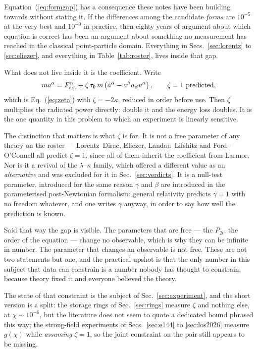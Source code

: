 \documentclass[preprint]{aastex701}
\newcommand{\Fext}{F^\alpha_{\rm ext}}
\newcommand{\taunought}{\tau_0}
\begin{document}
Equation~(\ref{eq:formgap}) has a consequence these notes have been building
towards without stating it. If the differences among the candidate \emph{forms}
are $10^{-5}$ at the very best and $10^{-9}$ in practice, then eighty years of
argument about which equation is correct has been an argument about something no
measurement has reached in the classical point-particle domain. Everything in
Secs.~\ref{sec:lorentz} to
\ref{sec:eliezer}, and everything in Table~\ref{tab:roster}, lives inside that
gap.

What does not live inside it is the coefficient. Write
\begin{equation}
ma^\alpha = \Fext + \zeta\,\taunought\,m
\left(\dot a^\alpha - a^\beta a_\beta u^\alpha\right),
\qquad \zeta = 1 \ \text{predicted},
\label{eq:zetadef}
\end{equation}
which is Eq.~(\ref{eq:zeta}) with $\zeta=-2\kappa$, reduced in order before use.
Then $\zeta$ multiplies the radiated power directly: double it and the energy
loss doubles. It is the one quantity in this problem to which an experiment is
linearly sensitive.

The distinction that matters is what $\zeta$ is for. It is not a free parameter
of any theory on the roster --- Lorentz--Dirac, Eliezer, Landau--Lifshitz and
Ford--O'Connell all predict $\zeta=1$, since all of them inherit the coefficient
from Larmor. Nor is it a revival of the $\lambda$--$\kappa$ family, which
offered a different value as an \emph{alternative} and was excluded for it in
Sec.~\ref{sec:verdicts}. It is a null-test parameter, introduced for the same
reason $\gamma$ and $\beta$ are introduced in the parameterised post-Newtonian
formalism: general relativity predicts $\gamma=1$ with no freedom whatever, and
one writes $\gamma$ anyway, in order to say how well the prediction is known.

Said that way the gap is visible. The parameters that are free --- the $P_{2i}$,
the order of the equation --- change no observable, which is why they can be
infinite in number. The parameter that changes an observable is not free. These
are not two statements but one, and the practical upshot is that the only
number in this subject that data can constrain is a number nobody has thought to
constrain, because theory fixed it and everyone believed the theory.

The state of that constraint is the subject of Sec.~\ref{sec:experiment}, and
the short version is a split: the storage rings of Sec.~\ref{sec:rings} measure
$\zeta$ and nothing else, at $\chi\sim10^{-6}$, but the literature does not
seem to quote a dedicated bound phrased this way; the strong-field experiments
of Secs.~\ref{sec:e144} to \ref{sec:los2026} measure $g(\chi)$ while
\emph{assuming} $\zeta=1$, so the joint constraint on the pair still appears to
be missing.
\end{document}
